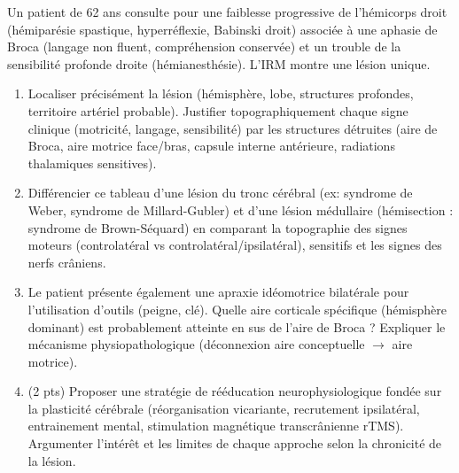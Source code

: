 \documentclass[11pt]{article}
\begin{document}
\begin{exercice}
Un patient de 62 ans consulte pour une faiblesse progressive de l'hémicorps droit (hémiparésie spastique, hyperréflexie, Babinski droit) associée à une aphasie de Broca (langage non fluent, compréhension conservée) et un trouble de la sensibilité profonde droite (hémianesthésie). L'IRM montre une lésion unique.
\begin{enumerate}
    \item Localiser précisément la lésion (hémisphère, lobe, structures profondes, territoire artériel probable). Justifier topographiquement chaque signe clinique (motricité, langage, sensibilité) par les structures détruites (aire de Broca, aire motrice face/bras, capsule interne antérieure, radiations thalamiques sensitives).
    \item Différencier ce tableau d'une lésion du tronc cérébral (ex: syndrome de Weber, syndrome de Millard-Gubler) et d'une lésion médullaire (hémisection : syndrome de Brown-Séquard) en comparant la topographie des signes moteurs (controlatéral vs controlatéral/ipsilatéral), sensitifs et les signes des nerfs crâniens.
    \item Le patient présente également une apraxie idéomotrice bilatérale pour l'utilisation d'outils (peigne, clé). Quelle aire corticale spécifique (hémisphère dominant) est probablement atteinte en sus de l'aire de Broca ? Expliquer le mécanisme physiopathologique (déconnexion aire conceptuelle $\rightarrow$ aire motrice).
    \item (2 pts) Proposer une stratégie de rééducation neurophysiologique fondée sur la plasticité cérébrale (réorganisation vicariante, recrutement ipsilatéral, entrainement mental, stimulation magnétique transcrânienne rTMS). Argumenter l'intérêt et les limites de chaque approche selon la chronicité de la lésion.
\end{enumerate}
\end{exercice}
\end{document}
